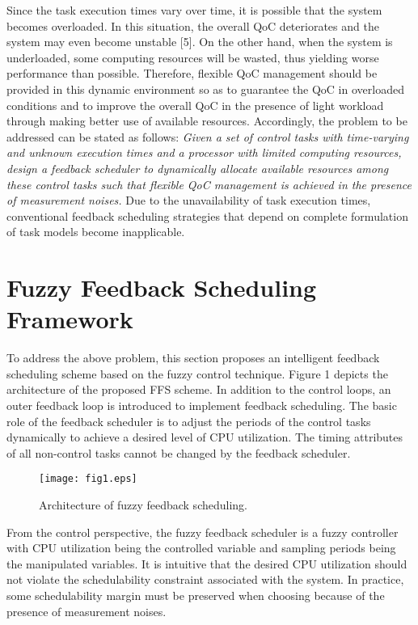 \documentclass[12pt,a4paper]{ijicic}
\begin{document}
Since the task execution times vary over time, it is possible that
the system becomes overloaded. In this situation, the overall QoC
deteriorates and the system may even become unstable [5]. On the
other hand, when the system is underloaded, some computing resources will be
wasted, thus yielding worse performance than possible. Therefore,
flexible QoC management should be provided in this dynamic
environment so as to guarantee the QoC in overloaded conditions and
to improve the overall QoC in the presence of light workload through
making better use of available resources. Accordingly, the problem
to be addressed can be stated as follows: \emph{Given a set of
control tasks with time-varying and unknown execution times and a
processor with limited computing resources, design a feedback
scheduler to dynamically allocate available resources among these
control tasks such that flexible QoC management is achieved in the
presence of measurement noises.} Due to the unavailability of task
execution times, conventional feedback scheduling strategies that
depend on complete formulation of task models become inapplicable.

\section{Fuzzy Feedback Scheduling Framework}
\label{sec:3}

To address the
above problem, this section proposes an intelligent feedback
scheduling scheme based on the fuzzy control technique. Figure 1
depicts the architecture of the proposed FFS scheme. In addition to
the control loops, an outer feedback loop is introduced to implement
feedback scheduling. The basic role of the feedback scheduler is to
adjust the periods of the control tasks dynamically to achieve a
desired level of CPU utilization. The timing attributes of all
non-control tasks cannot be changed by the feedback scheduler.

\begin{figure}[htbp!]
\centering
\texttt{[image: fig1.eps]}
\caption{Architecture of fuzzy feedback scheduling.}
\label{fig1}
\end{figure}

From the control perspective, the fuzzy feedback scheduler is a
fuzzy controller with CPU utilization being the controlled variable
and sampling periods being the manipulated variables. It is
intuitive that the desired CPU utilization  should not violate
the schedulability constraint associated with the system. In
practice, some schedulability margin must be preserved when choosing
 because of the presence of measurement noises.
\end{document}
